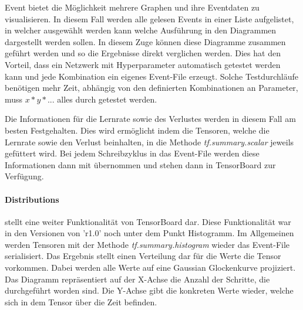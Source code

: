 \noindent
Event bietet die Möglichkeit mehrere Graphen und ihre Eventdaten zu visualisieren. 
In diesem Fall werden alle gelesen Events in einer Liste aufgelistet, in welcher ausgewählt werden kann welche Ausführung in den Diagrammen dargestellt werden sollen. 
In diesem Zuge können diese Diagramme zusammen geführt werden und so die Ergebnisse direkt verglichen werden. 
Dies hat den Vorteil, dass ein Netzwerk mit Hyperparameter automatisch getestet werden kann und jede Kombination ein eigenes Event-File erzeugt. 
Solche Testdurchläufe benötigen mehr Zeit, abhängig von den definierten Kombinationen an Parameter, muss $x * y * ...$ alles durch getestet werden.
\phantom \newline

\noindent
Die Informationen für die Lernrate sowie des Verlustes werden in diesem Fall am besten Festgehalten. 
Dies wird ermöglicht indem die Tensoren, welche die Lernrate sowie den Verlust beinhalten, in die Methode \textit{tf.summary.scalar} jeweils gefüttert wird. 
Bei jedem Schreibzyklus in das Event-File werden diese Informationen dann mit übernommen und stehen dann in TensorBoard zur Verfügung.

\paragraph{Distributions} stellt eine weiter Funktionalität von TensorBoard dar.  %
Diese Funktionalität war in den Versionen von 'r1.0' noch unter dem Punkt Histogramm. 
Im Allgemeinen werden Tensoren mit der Methode \textit{tf.summary.histogram} wieder das Event-File serialisiert. 
Das Ergebnis stellt einen Verteilung dar für die Werte die Tensor vorkommen. 
Dabei werden alle Werte auf eine Gaussian Glockenkurve projiziert. 
Das Diagramm repräsentiert auf der X-Achse die Anzahl der Schritte, die durchgeführt worden sind. 
Die Y-Achse gibt die konkreten Werte wieder, welche sich in dem Tensor über die Zeit befinden. 

